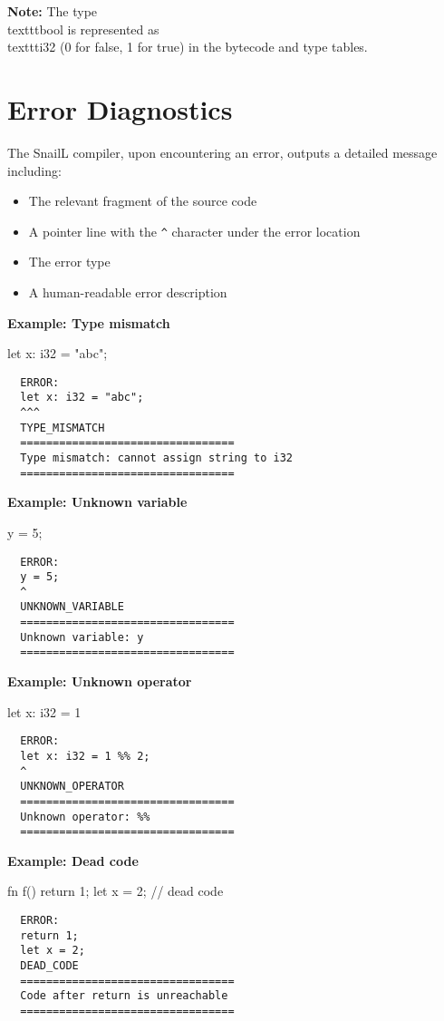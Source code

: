 \documentclass[a4paper,12pt]{article}
\begin{document}
\textbf{Note:} The type \\texttt{bool} is represented as \\texttt{i32} (0 for false, 1 for true) in the bytecode and type tables.

\section{Error Diagnostics}

  The SnailL compiler, upon encountering an error, outputs a detailed message including:
\begin{itemize}
\item The relevant fragment of the source code
\item A pointer line with the \texttt{^} character under the error location
\item The error type
\item A human-readable error description
\end{itemize}

\textbf{Example: Type mismatch}
\begin{snailcode}
  let x: i32 = "abc";
\end{snailcode}
\begin{verbatim}
  ERROR:
  let x: i32 = "abc";
  ^^^
  TYPE_MISMATCH
  =================================
  Type mismatch: cannot assign string to i32
  =================================
\end{verbatim}

\textbf{Example: Unknown variable}
\begin{snailcode}
  y = 5;
\end{snailcode}
\begin{verbatim}
  ERROR:
  y = 5;
  ^
  UNKNOWN_VARIABLE
  =================================
  Unknown variable: y
  =================================
\end{verbatim}

\textbf{Example: Unknown operator}
\begin{snailcode}
  let x: i32 = 1 %
\end{snailcode}
\begin{verbatim}
  ERROR:
  let x: i32 = 1 %% 2;
  ^
  UNKNOWN_OPERATOR
  =================================
  Unknown operator: %%
  =================================
\end{verbatim}

\textbf{Example: Dead code}
\begin{snailcode}
  fn f() {
  return 1;
  let x = 2; // dead code
  }
\end{snailcode}
\begin{verbatim}
  ERROR:
  return 1;
  let x = 2;
  DEAD_CODE
  =================================
  Code after return is unreachable
  =================================
\end{verbatim}
\end{document}
